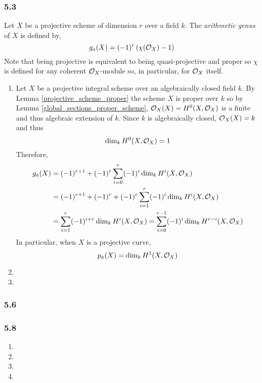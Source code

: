 \documentclass[12pt]{article}
\begin{document}
\subsubsection{5.3}

Let $X$ be a projective scheme of dimension $r$ over a field $k$. The \textit{arithmetic genus} of $X$ is defined by,
\[ g_a(X) = (-1)^r \left( \chi(\mathcal{O}_{X}) - 1 \right) \]
Note that being projective is equivalent to being quasi-projective and proper so $\chi$ is defined for any coherent $\mathcal{O}_{X}$-module so, in particular, for $\mathcal{O}_{X}$ itself. 
 
\begin{enumerate}
\item Let $X$ be a projective integral scheme over an algebraically closed field $k$. By Lemma \ref{projective_scheme_proper} the scheme $X$ is proper over $k$ so by Lemma \ref{global_sections_proper_scheme}, $\mathcal{O}_{X}(X) = H^0(X, \mathcal{O}_{X})$ is a finite and thus algebraic extension of $k$. Since $k$ is algebraically closed, $\mathcal{O}_{X}(X) = k$
 and thus \[ \dim_k H^0(X, \mathcal{O}_{X}) = 1 \]
Therefore,
\begin{align*}
g_a(X) & = (-1)^{r + 1} + (-1)^r \sum_{i = 0}^r (-1)^i \dim_k H^i(X, \mathcal{O}_{X})
\\
& = (-1)^{r + 1} + (-1)^r + (-1)^r \sum_{i = 1}^r (-1)^i \dim_k H^i(X, \mathcal{O}_{X})
\\
& = \sum_{i = 1}^r (-1)^{i + r} \dim_k H^i(X, \mathcal{O}_{X}) = \sum_{i = 0}^{r-1} (-1)^i \dim_k H^{r - i}(X, \mathcal{O}_{X})
\end{align*}
In particular, when $X$ is a projective curve,
\[ p_a(X) = \dim_k H^1(X, \mathcal{O}_{X}) \]

\item

\item 


\end{enumerate}

\subsubsection{5.6}

\subsubsection{5.8}

\begin{enumerate}
\item

\item

\item

\item
\end{enumerate}
\end{document}
